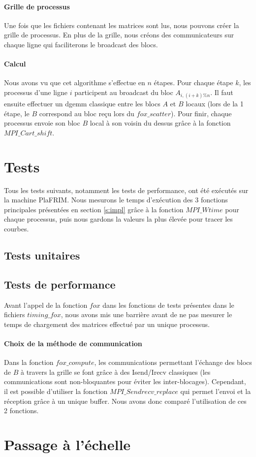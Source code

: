 \documentclass[12pt]{article}
\begin{document}
\paragraph{Grille de processus}
Une fois que les fichiers contenant les matrices sont lus, nous pouvons créer la grille de processus. En plus de la grille, nous créons des communicateurs sur chaque ligne qui faciliterons le broadcast des blocs.

\paragraph{Calcul}
Nous avons vu que cet algorithme s'effectue en $n$ étapes. Pour chaque étape $k$, les processus d'une ligne $i$ participent au broadcast du bloc $A_{i,(i+k)\%n}$. Il faut ensuite effectuer un dgemm classique entre les blocs $A$ et $B$ locaux (lors de la 1\iere{} étape, le $B$ correspond au bloc reçu lors du $fox\_scatter$). Pour finir, chaque processus envoie son bloc $B$ local à son voisin du dessus grâce à la fonction $MPI\_Cart\_shift$.

\section{Tests}
Tous les tests suivants, notamment les tests de performance, ont été exécutés sur la machine PlaFRIM. Nous mesurons le temps d'exécution des 3 fonctions principales présentées en section \ref{s:impl} grâce à la fonction $MPI\_Wtime$ pour chaque processus, puis nous gardons la valeurs la plus élevée pour tracer les courbes.

\subsection{Tests unitaires}

\subsection{Tests de performance}
Avant l'appel de la fonction $fox$ dans les fonctions de tests présentes dans le fichiers $timing\_fox$, nous avons mis une barrière avant de ne pas mesurer le temps de chargement des matrices effectué par un unique processus.

\paragraph{Choix de la méthode de communication}
Dans la fonction $fox\_compute$, les communications permettant l'échange des blocs de $B$ à travers la grille se font grâce à des Isend/Irecv classiques (les communications sont non-bloquantes pour éviter les inter-blocages). Cependant, il est possible d'utiliser la fonction $MPI\_Sendrecv\_replace$ qui permet l'envoi et la réception grâce à un unique buffer. Nous avons donc comparé l'utilisation de ces 2 fonctions.


\section{Passage à l'échelle}
\end{document}
